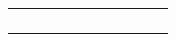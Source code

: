 \begin{landscape}
\begin{longtable}{|c|c|c|c|c|c|c|c|c|c|}
	         &        &      &                        &          &      &        &    &                          &  \\ \hline
	         &        &      &                        &          &      &        &    &                          &  \\ \hline
	         &        &      &                        &          &      &        &    &                          &  \\ \hline
	         &        &      &                        &          &      &        &    &                          &  \\ \hline
	         &        &      &                        &          &      &        &    &                          &  \\ \hline
\end{longtable}
\end{landscape}
\clearpage
